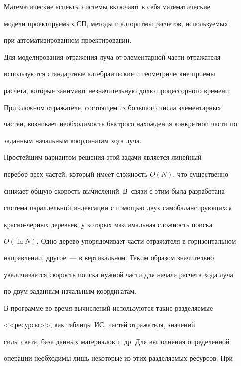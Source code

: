   


  Математические аспекты системы включают в себя математические 


модели проектируемых СП, методы и алгоритмы расчетов, используемых 


при автоматизированном проектировании.


  


  Для моделирования отражения луча от элементарной части отражателя 


используются стандартные алгебраические и геометрические приемы 


расчета, которые занимают незначительную долю процессорного времени. 


При сложном отражателе, состоящем из большого числа элементарных 


частей, возникает необходимость быстрого нахождения конкретной части по 


заданным начальным координатам хода луча.


     


     Простейшим вариантом решения этой задачи является линейный 


перебор всех частей, который имеет сложность $O(N)$, что существенно 


снижает общую скорость вычислений. В~связи с этим была разработана 


система параллельной индексации с помощью двух самобалансирующихся 


крас\-но-чер\-ных деревьев, у которых максимальная сложность поиска 


$O(\ln N)$. Одно дерево упорядочивает части отражателя в горизонтальном 


направлении, другое~--- в вертикальном. Таким образом значительно 


увеличивается скорость поиска нужной части для начала расчета хода луча 


по двум заданным начальным координатам.


     


     В программе во время вычислений используются такие разделяемые 


<<ресурсы>>, как таблицы ИС, час\-тей отражателя, значений 


силы света, база данных материалов и~др. Для выполнения определенной 


операции необходимы лишь некоторые из этих разделяемых ресурсов. При 


